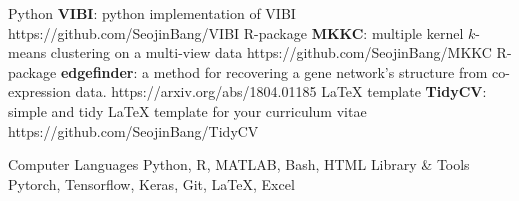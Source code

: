 \documentclass{tidycv} %
\begin{document}
\begin{cvsoftwares}
  \cvsoftware
  {Python} %
  {{\bf VIBI}: python implementation of VIBI} %
  {https://github.com/SeojinBang/VIBI} %
  \cvsoftware
  {R-package} %
  {{\bf MKKC}: multiple kernel $k$-means clustering on a multi-view data} %
  {https://github.com/SeojinBang/MKKC} %
  \cvsoftware
  {R-package} %
  {{\bf edgefinder}: a method for recovering a gene network’s structure from co-expression data.} %
  {https://arxiv.org/abs/1804.01185} %
  \cvsoftware
  {LaTeX template} %
  {{\bf TidyCV}: simple and tidy LaTeX template for your curriculum vitae} %
  {https://github.com/SeojinBang/TidyCV} %
\end{cvsoftwares}

\begin{cvtechnicalstrengths}
  \cvtechnicalstrength
  {Computer Languages} %
  {Python, R, MATLAB, Bash, HTML} %
  \cvtechnicalstrength
  {Library \& Tools} %
  {Pytorch, Tensorflow, Keras, Git, LaTeX, Excel} %
\end{cvtechnicalstrengths}
\end{document}
